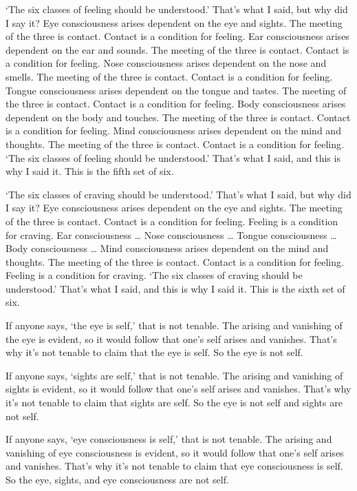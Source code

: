 \documentclass[12pt,openany]{book}%
\begin{document}
‘The six classes of feeling should be understood.’ That’s what I said, but why did I say it? Eye consciousness arises dependent on the eye and sights. The meeting of the three is contact. Contact is a condition for feeling. Ear consciousness arises dependent on the ear and sounds. The meeting of the three is contact. Contact is a condition for feeling. Nose consciousness arises dependent on the nose and smells. The meeting of the three is contact. Contact is a condition for feeling. Tongue consciousness arises dependent on the tongue and tastes. The meeting of the three is contact. Contact is a condition for feeling. Body consciousness arises dependent on the body and touches. The meeting of the three is contact. Contact is a condition for feeling. Mind consciousness arises dependent on the mind and thoughts. The meeting of the three is contact. Contact is a condition for feeling. ‘The six classes of feeling should be understood.’ That’s what I said, and this is why I said it. This is the fifth set of six. 

‘The six classes of craving should be understood.’ That’s what I said, but why did I say it? Eye consciousness arises dependent on the eye and sights. The meeting of the three is contact. Contact is a condition for feeling. Feeling is a condition for craving. Ear consciousness … Nose consciousness … Tongue consciousness … Body consciousness … Mind consciousness arises dependent on the mind and thoughts. The meeting of the three is contact. Contact is a condition for feeling. Feeling is a condition for craving. ‘The six classes of craving should be understood.’ That’s what I said, and this is why I said it. This is the sixth set of six. 

If anyone says, ‘the eye is self,’ that is not tenable. The arising and vanishing of the eye is evident, so it would follow that one’s self arises and vanishes. That’s why it’s not tenable to claim that the eye is self. So the eye is not self. 

If anyone says, ‘sights are self,’ that is not tenable. The arising and vanishing of sights is evident, so it would follow that one’s self arises and vanishes. That’s why it’s not tenable to claim that sights are self. So the eye is not self and sights are not self. 

If anyone says, ‘eye consciousness is self,’ that is not tenable. The arising and vanishing of eye consciousness is evident, so it would follow that one’s self arises and vanishes. That’s why it’s not tenable to claim that eye consciousness is self. So the eye, sights, and eye consciousness are not self. 
\end{document}

